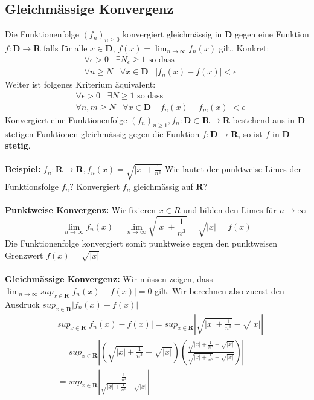 \documentclass[8pt]{article}
\begin{document}
\begin{multicols*}{3}
\subsection{Gleichmässige Konvergenz}
 Die Funktionenfolge $(f_n)_{n \geq 0}$ konvergiert gleichmässig in $\mathbf{D}$ gegen eine Funktion
$f:\mathbf{D} \rightarrow \mathbf{R}$ falls für alle $x \in \mathbf{D}$, $f(x) = \lim_{n \rightarrow \infty} f_n(x)$ gilt. Konkret:
\begin{align*}
  &\forall \epsilon > 0 \;\;\; \exists N_{\epsilon} \geq 1 \text{ so dass }\\
  &\forall n \geq N \;\;\;\forall x \in \mathbf{D} \;\;\; |f_n(x) - f(x)| < \epsilon
\end{align*}
Weiter ist folgenes Kriterium äquivalent:
\begin{align*}
  &\forall \epsilon > 0 \;\;\; \exists N \geq 1 \text{ so dass }\\
  &\forall n, m \geq N \;\;\;\forall x \in \mathbf{D} \;\;\; |f_n(x) - f_m(x)| < \epsilon
\end{align*}
Konvergiert eine Funktionenfolge $(f_n)_{n \geq 1}, f_n:\mathbf{D} \subset \mathbf{R} \rightarrow \mathbf{R}$
bestehend aus in $\mathbf{D}$ stetigen Funktionen gleichmässig gegen die Funktion $f:\mathbf{D} \rightarrow \mathbf{R}$, so
ist $f$ in $\mathbf{D}$ \textbf{stetig}.\\
\\
\textbf{Beispiel:}
$f_n : \mathbf{R} \rightarrow \mathbf{R}, f_n(x) = \sqrt{|x| + \frac{1}{n^3}}$
Wie lautet der punktweise Limes der Funktionsfolge $f_n$? Konvergiert $f_n$ gleichmässig auf  $\mathbf{R}$?\\ 
\\
\textbf{Punktweise Konvergenz:} Wir fixieren $x \in R$ und bilden den Limes für $n \rightarrow \infty$
$$
\lim_{n \to \infty} f_n(x) = \lim_{n \rightarrow \infty} \sqrt{|x| + \frac{1}{n^3}} = \sqrt{|x|} = f(x)
$$
Die Funktionenfolge konvergiert somit punktweise gegen den punktweisen Grenzwert $f(x) = \sqrt{|x|}$\\
\\
\textbf{Gleichmässige Konvergenz:} Wir müssen zeigen, dass $\lim_{n \to \infty} sup_{x \in \mathbf{R}} |f_n(x) - f(x)| = 0$ gilt. Wir berechnen also zuerst den Ausdruck $sup_{x \in \mathbf{R}} |f_n(x) - f(x)|$
\begin{align*}
	&sup_{x \in \mathbf{R}} |f_n(x) - f(x)| = sup_{x \in \mathbf{R}} \left|\sqrt{|x| + \frac{1}{n^3}} - \sqrt{|x|}\right|\\
	& =  sup_{x \in \mathbf{R}} \left|\left(\sqrt{|x| + \frac{1}{n^3}} - \sqrt{|x|}\right) \left(\frac{\sqrt{|x| + \frac{1}{n^3}} + \sqrt{|x|}}{\sqrt{|x| + \frac{1}{n^3}} + \sqrt{|x|}}\right)\right| \\
	& = sup_{x \in \mathbf{R}} \left|\frac{\frac{1}{n^3}}{\sqrt{|x| + \frac{1}{n^3}} + \sqrt{|x|}}\right|
\end{align*}


\end{multicols*}
\end{document}
